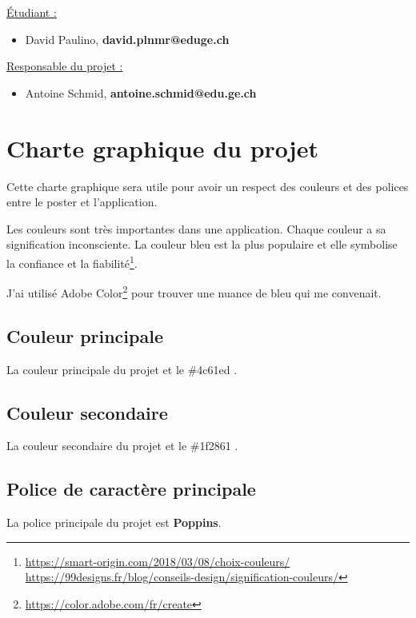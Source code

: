 \documentclass[a4paper,14pt]{extarticle}
\begin{document}
{{\underline{Étudiant :}}
\begin{itemize}
    \item David Paulino, \textbf{david.plnmr@eduge.ch}
\end{itemize}
 {\underline{Responsable du projet :}}
\begin{itemize}
    \item Antoine Schmid, \textbf{antoine.schmid@edu.ge.ch}
\end{itemize}

\newpage

\section{Charte graphique du projet}

Cette charte graphique sera utile pour avoir un respect des couleurs et des polices entre le poster et l'application.

Les couleurs sont très importantes dans une application. Chaque couleur a sa signification inconsciente. La couleur bleu est la plus populaire et elle symbolise la confiance et la fiabilité\footnote{\url{https://smart-origin.com/2018/03/08/choix-couleurs/} \url{https://99designs.fr/blog/conseils-design/signification-couleurs/}}.

J'ai utilisé Adobe Color\footnote{\url{https://color.adobe.com/fr/create}} pour trouver une nuance de bleu qui me convenait.


\subsection{Couleur principale}
La couleur principale du projet et le \#4c61ed .

\subsection{Couleur secondaire}
La couleur secondaire du projet et le \#1f2861 .

\subsection{Police de caractère principale}
La police principale du projet est \textbf{Poppins}.

}
\end{document}
